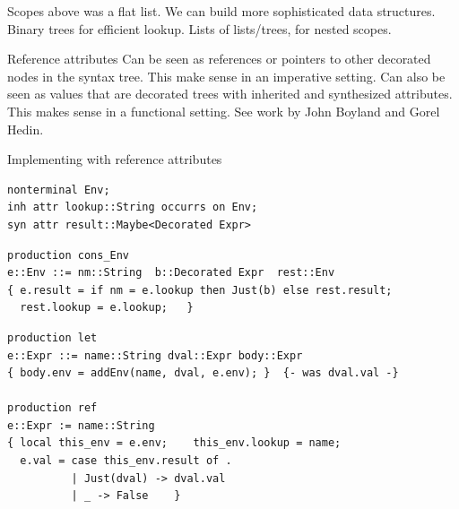 \documentclass[notes,11pt,aspectratio=169]{beamer}
\begin{document}
\begin{frame}{Scopes}
\biA
 \x {} above was a flat list.
 \x We can build more sophisticated data structures.
 \x Binary trees for efficient lookup.
 \x Lists of lists/trees, for nested scopes.
\ei
\end{frame}



\begin{frame}{Reference attributes}
\biA
\x Can be seen as references or pointers to other decorated nodes in
the syntax tree.
\bi
 \x This make sense in an imperative setting.
\ei
\x Can also be seen as values that are decorated trees with inherited
and synthesized attributes.
 \bi
  \x This makes sense in a functional setting.
 \ei
\x See work by John Boyland and G\:orel Hedin.
\ei
\end{frame}

\begin{frame}[fragile]{Implementing  with reference attributes}
\small
\begin{verbatim}
nonterminal Env;
inh attr lookup::String occurrs on Env;
syn attr result::Maybe<Decorated Expr>
\end{verbatim}

\pause
\begin{verbatim}
production cons_Env
e::Env ::= nm::String  b::Decorated Expr  rest::Env
{ e.result = if nm = e.lookup then Just(b) else rest.result;
  rest.lookup = e.lookup;   }
\end{verbatim}

\pause
\begin{verbatim}
production let
e::Expr ::= name::String dval::Expr body::Expr
{ body.env = addEnv(name, dval, e.env); }  {- was dval.val -}

production ref
e::Expr := name::String
{ local this_env = e.env;    this_env.lookup = name;
  e.val = case this_env.result of .
          | Just(dval) -> dval.val 
          | _ -> False    }
\end{verbatim}

\end{frame}
\end{document}
